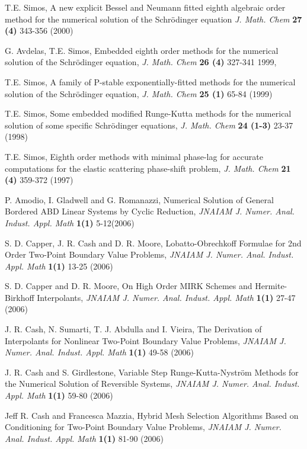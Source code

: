 \documentclass[numreferences]{kluwer}
\begin{document}
\begin{article}
\begin{thebibliography}{120}
T.E. Simos, A new explicit Bessel and Neumann fitted eighth
algebraic order method for the numerical solution of the
Schr\"odinger equation {\it J. Math. Chem} {\bf 27 (4)} 343-356
(2000)

G. Avdelas, T.E. Simos, Embedded eighth order methods for the
numerical solution of the Schr\"odinger equation, {\it J. Math.
Chem} {\bf 26 (4)} 327-341 1999,

T.E. Simos, A family of P-stable exponentially-fitted methods for
the numerical solution of the Schr\"odinger equation, {\it J.
Math. Chem} {\bf 25 (1)} 65-84 (1999)

T.E. Simos, Some embedded modified Runge-Kutta methods for the
numerical solution of some specific Schr\"odinger equations, {\it
J. Math. Chem} {\bf 24 (1-3)} 23-37 (1998)

T.E. Simos, Eighth order methods with minimal phase-lag for
accurate computations for the elastic scattering phase-shift
problem, {\it J. Math. Chem} {\bf 21 (4)} 359-372 (1997)

P. Amodio, I. Gladwell and G. Romanazzi, Numerical Solution of
General Bordered ABD Linear Systems by Cyclic Reduction, {\it
JNAIAM J. Numer. Anal. Indust. Appl. Math} {\bf 1(1)} 5-12(2006)

S. D. Capper, J. R. Cash and D. R. Moore, Lobatto-Obrechkoff
Formulae for 2nd Order Two-Point Boundary Value Problems, {\it
JNAIAM J. Numer. Anal. Indust. Appl. Math} {\bf 1(1)} 13-25 (2006)

S. D. Capper and D. R. Moore, On High Order MIRK Schemes and
Hermite-Birkhoff Interpolants, {\it JNAIAM J. Numer. Anal. Indust.
Appl. Math} {\bf 1(1)} 27-47 (2006)

J. R. Cash, N. Sumarti, T. J. Abdulla and I. Vieira, The
Derivation of Interpolants for Nonlinear Two-Point Boundary Value
Problems, {\it JNAIAM J. Numer. Anal. Indust. Appl. Math} {\bf
1(1)} 49-58 (2006)

J. R. Cash and S. Girdlestone, Variable Step Runge-Kutta-Nyström
Methods for the Numerical Solution of Reversible Systems,  {\it
JNAIAM J. Numer. Anal. Indust. Appl. Math} {\bf 1(1)} 59-80 (2006)

Jeff R. Cash and Francesca Mazzia, Hybrid Mesh Selection
Algorithms Based on Conditioning for Two-Point Boundary Value
Problems, {\it JNAIAM J. Numer. Anal. Indust. Appl. Math} {\bf
1(1)} 81-90 (2006)


\end{thebibliography}
\end{article}
\end{document}
